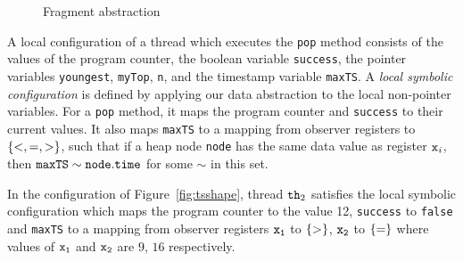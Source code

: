 \begin{figure}
	
\caption{Fragment abstraction}
\label{fig:tsviewshape}
\end{figure} 

A local configuration of a thread which executes the {\tt pop} method consists
of the values of the program counter, the boolean variable {\tt success}, the
pointer variables {\tt youngest}, {\tt myTop}, {\tt n},
and the timestamp variable {\tt maxTS}.
A {\em local symbolic configuration} is defined by applying our data abstraction
to the local non-pointer variables.  For a {\tt pop} method, it maps
the program counter and {\tt success} to their current values. It also maps
{\tt maxTS} to a mapping from observer registers to $\left\{<,=,>\right\}$, such that
if a heap node {\tt node} has the same data value as register $\mathtt{x}_i$, then
${\tt maxTS} \sim {\tt node.time}$ for some $\sim$ in this set.

In the configuration of Figure~\ref{fig:tsshape}, thread ${\tt th}_2$
satisfies the local symbolic configuration which maps the program counter to the value 12, {\tt success} to {\tt false} and {\tt maxTS} to a mapping from observer registers $\tt x_1$ to $\left\{>\right\}$, $\tt x_2$ to $\left\{=\right\}$ where values of $\tt x_1$ and $\tt x_2$ are $9$, $16$ respectively.







